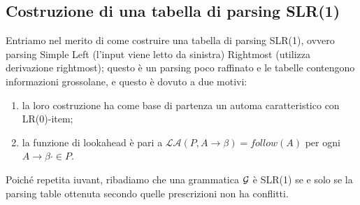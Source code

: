 \documentclass[class=book, crop=false, oneside, 12pt]{standalone}
\begin{document}
\subsection{Costruzione di una tabella di parsing SLR(1)}
Entriamo nel merito di come costruire una tabella di parsing SLR(1), ovvero parsing Simple Left (l'input viene letto da sinistra) Rightmost (utilizza derivazione rightmost); questo è un parsing poco raffinato e le tabelle contengono informazioni grossolane, e questo è dovuto a due motivi:
\begin{enumerate}
    \item la loro costruzione ha come base di partenza un automa caratteristico con LR(0)-item;
    \item la funzione di lookahead è pari a \(\mathcal{LA}(P, A \rightarrow \beta) = follow(A)\) per ogni \(A \rightarrow \beta \cdot \in P\).
\end{enumerate}
Poiché repetita iuvant, ribadiamo che una grammatica \(\mathcal{G}\) è SLR(1) se e solo se la parsing table ottenuta secondo quelle prescrizioni non ha conflitti.
\end{document}

